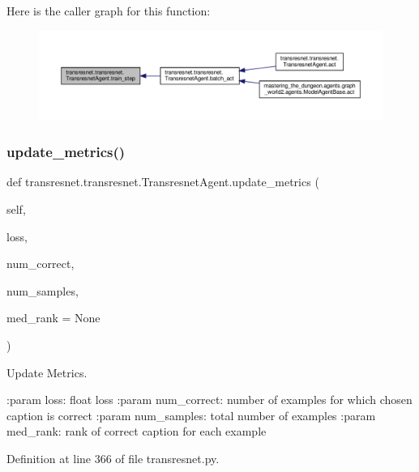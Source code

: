 Here is the caller graph for this function\+:
\nopagebreak
\begin{figure}[H]
\begin{center}
\leavevmode
\includegraphics[width=350pt]{classtransresnet_1_1transresnet_1_1TransresnetAgent_a6e576f371b589734c69998b75b72577c_icgraph}
\end{center}
\end{figure}
\mbox{\label{classtransresnet_1_1transresnet_1_1TransresnetAgent_ae061df235655fbf253702a21b0461755}} 
\subsubsection{\texorpdfstring{update\+\_\+metrics()}{update\_metrics()}}
{\footnotesize\ttfamily def transresnet.\+transresnet.\+Transresnet\+Agent.\+update\+\_\+metrics (\begin{DoxyParamCaption}\item[{}]{self,  }\item[{}]{loss,  }\item[{}]{num\+\_\+correct,  }\item[{}]{num\+\_\+samples,  }\item[{}]{med\+\_\+rank = {\ttfamily None} }\end{DoxyParamCaption})}

\begin{DoxyVerb}Update Metrics.

:param loss:
    float loss
:param num_correct:
    number of examples for which chosen caption is correct
:param num_samples:
    total number of examples
:param med_rank:
    rank of correct caption for each example
\end{DoxyVerb}
 

Definition at line 366 of file transresnet.\+py.



